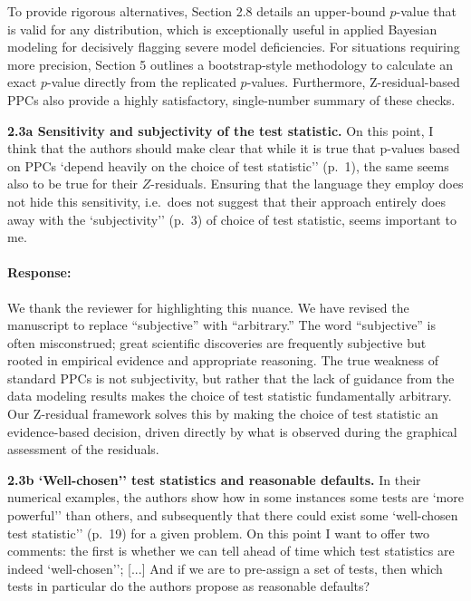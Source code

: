 \documentclass[11pt]{article}
\newcommand*{\mybox}[2]{%
  \par\medskip\noindent
  \colorbox{#1!30}{\parbox{.98\linewidth}{#2}}%
  \par\medskip
}
\begin{document}
To provide rigorous alternatives, Section 2.8 details an upper-bound $p$-value that is valid for any distribution, which is exceptionally useful in applied Bayesian modeling for decisively flagging severe model deficiencies. For situations requiring more precision, Section 5 outlines a bootstrap-style methodology to calculate an exact $p$-value directly from the replicated $p$-values. Furthermore, Z-residual-based PPCs also provide a highly satisfactory, single-number summary of these checks.



\mybox{gray}{\textbf{2.3a Sensitivity and subjectivity of the test statistic.} On this point, I think that the authors should make clear that while it is true that p-values based on PPCs `depend heavily on the choice of test statistic'' (p.~1), the same seems also to be true for their $Z$-residuals. Ensuring that the language they employ does not hide this sensitivity, i.e.\ does not suggest that their approach entirely does away with the `subjectivity'' (p.~3) of choice of test statistic, seems important to me.}

\paragraph{Response:}

We thank the reviewer for highlighting this nuance. We have revised the manuscript to replace ``subjective'' with ``arbitrary.'' The word ``subjective'' is often misconstrued; great scientific discoveries are frequently subjective but rooted in empirical evidence and appropriate reasoning. The true weakness of standard PPCs is not subjectivity, but rather that the lack of guidance from the data modeling results makes the choice of test statistic fundamentally arbitrary. Our Z-residual framework solves this by making the choice of test statistic an evidence-based decision, driven directly by what is observed during the graphical assessment of the residuals.


\mybox{gray}{\textbf{2.3b `Well-chosen'' test statistics and reasonable defaults.} In their numerical examples, the authors show how in some instances some tests are `more powerful'' than others, and subsequently that there could exist some `well-chosen test statistic'' (p.~19) for a given problem. On this point I want to offer two comments: the first is whether we can tell ahead of time which test statistics are indeed `well-chosen''; [...] And if we are to pre-assign a set of tests, then which tests in particular do the authors propose as reasonable defaults?}
\end{document}
